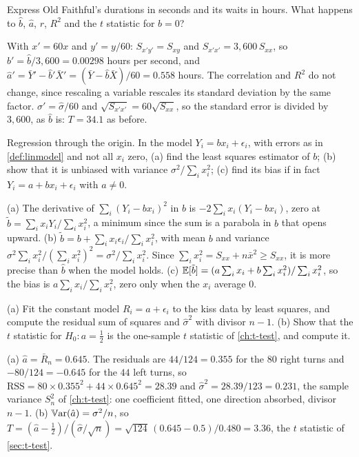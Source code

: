 \begin{exercise}
\label{ex:reg-units}
Express Old Faithful's durations in seconds and its waits in hours. What happens to $\hat{b}$, $\hat{a}$, $r$, $R^2$ and the $t$ statistic for $b = 0$?
\end{exercise}
\begin{solution}
With $x' = 60x$ and $y' = y/60$: $S_{x'y'} = S_{xy}$ and $S_{x'x'} = 3{,}600\,S_{xx}$, so $\hat{b}' = \hat{b}/3{,}600 = 0.00298$ hours per second, and $\hat{a}' = \bar{Y}' - \hat{b}'\bar{X}' = (\bar{Y} - \hat{b}\bar{X})/60 = 0.558$ hours. The correlation and $R^2$ do not change, since rescaling a variable rescales its standard deviation by the same factor. $\hat{\sigma}' = \hat{\sigma}/60$ and $\sqrt{S_{x'x'}} = 60\sqrt{S_{xx}}$, so the standard error is divided by $3{,}600$, as $\hat{b}$ is: $T = 34.1$ as before.
\end{solution}

\begin{exercise}
\label{ex:reg-origin}
Regression through the origin. In the model $Y_i = bx_i + \epsilon_i$, with errors as in \cref{def:linmodel} and not all $x_i$ zero, (a) find the least squares estimator of $b$; (b) show that it is unbiased with variance $\sigma^2/\sum_i x_i^2$; (c) find its bias if in fact $Y_i = a + bx_i + \epsilon_i$ with $a \neq 0$.
\end{exercise}
\begin{solution}
(a) The derivative of $\sum_i (Y_i - bx_i)^2$ in $b$ is $-2\sum_i x_i(Y_i - bx_i)$, zero at $\tilde{b} = \sum_i x_iY_i/\sum_i x_i^2$, a minimum since the sum is a parabola in $b$ that opens upward. (b) $\tilde{b} = b + \sum_i x_i\epsilon_i/\sum_i x_i^2$, with mean $b$ and variance $\sigma^2\sum_i x_i^2/(\sum_i x_i^2)^2 = \sigma^2/\sum_i x_i^2$. Since $\sum_i x_i^2 = S_{xx} + n\bar{x}^2 \geq S_{xx}$, it is more precise than $\hat{b}$ when the model holds. (c) $\operatorname*{\mathbb{E}}[\tilde{b}] = (a\sum_i x_i + b\sum_i x_i^2)/\sum_i x_i^2$, so the bias is $a\sum_i x_i/\sum_i x_i^2$, zero only when the $x_i$ average $0$.
\end{solution}

\begin{exercise}
\label{ex:reg-kiss}
(a) Fit the constant model $R_i = a + \epsilon_i$ to the kiss data by least squares, and compute the residual sum of squares and $\hat{\sigma}^2$ with divisor $n - 1$. (b) Show that the $t$ statistic for $H_0: a = \frac12$ is the one-sample $t$ statistic of \cref{ch:t-test}, and compute it.
\end{exercise}
\begin{solution}
(a) $\hat{a} = \bar{R}_n = 0.645$. The residuals are $44/124 = 0.355$ for the $80$ right turns and $-80/124 = -0.645$ for the $44$ left turns, so $\mathrm{RSS} = 80 \times 0.355^2 + 44 \times 0.645^2 = 28.39$ and $\hat{\sigma}^2 = 28.39/123 = 0.231$, the sample variance $S_n^2$ of \cref{ch:t-test}: one coefficient fitted, one direction absorbed, divisor $n - 1$. (b) $\operatorname*{\mathbb{V}\text{ar}}(\hat{a}) = \sigma^2/n$, so $T = (\hat{a} - \frac12)/(\hat{\sigma}/\sqrt{n}) = \sqrt{124}\,(0.645 - 0.5)/0.480 = 3.36$, the $t$ statistic of \cref{sec:t-test}.
\end{solution}

